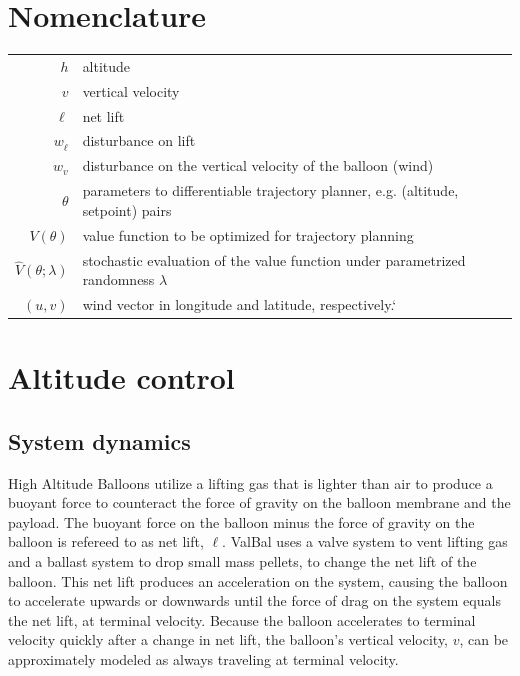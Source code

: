 \documentclass[11pt]{scrartcl} %
\begin{document}
\newcommand{\cf}{{\it cf.}}
\newcommand{\eg}{{\it e.g.}}
\newcommand{\ie}{{\it i.e.}}
\newcommand{\etc}{{\it etc.}}

\tableofcontents

\section*{Nomenclature}
\begin{tabular}{rl}
$h$ & altitude  \\
$v$ & vertical velocity\\
$\ell$ & net lift \\
$w_{\dot \ell}$ & disturbance on lift \\
$w_{v}$ & disturbance on the vertical velocity of the balloon (wind) \\
$\theta$ & parameters to differentiable trajectory planner, e.g. (altitude, setpoint) pairs\\
$V(\theta)$ & value function to be optimized for trajectory planning \\
$\hat V(\theta; \lambda)$ & stochastic evaluation of the value function under parametrized randomness $\lambda$ \\
$(u,v)$ & wind vector in longitude and latitude, respectively.`
\end{tabular}

\section{Altitude control}
\subsection{System dynamics}

High Altitude Balloons utilize a lifting gas that is lighter than air to produce a buoyant force to counteract the force of gravity on the balloon membrane and the payload. The buoyant force on the balloon minus the force of gravity on the balloon is refereed to as net lift, $\ell$. ValBal uses a valve system to vent lifting gas and a ballast system to drop small mass pellets, to change the net lift of the balloon. This net lift produces an acceleration on the system, causing the balloon to accelerate upwards or downwards until the force of drag on the system equals the net lift, at terminal velocity. Because the balloon accelerates to terminal velocity quickly after a change in net lift, the balloon's vertical velocity, $v$, can be approximately modeled as always traveling at terminal velocity.
\end{document}
